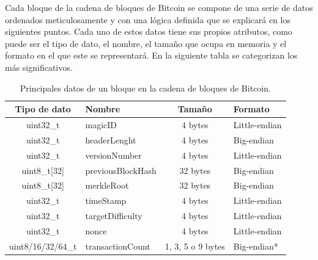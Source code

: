 \documentclass{article}
\begin{document}
    Cada bloque de la cadena de bloques de Bitcoin se compone de una serie de datos ordenados meticulosamente y con una lógica definida que se explicará en los siguientes puntos. Cada uno de estos datos tiene sus propios atributos, como puede ser el tipo de dato, el nombre, el tamaño que ocupa en memoria y el formato en el que este se representará. En la siguiente tabla se categorizan los más significativos.
    \begin{table}[H]
    \centering
    \begin{tabular}{| c | l | c | l |} 
        \hline
        Tipo de dato & Nombre & Tamaño & Formato \\
        \hline
        uint32\_t & magicID & 4 bytes & Little-endian \\
        \hline
        uint32\_t & headerLenght & 4 bytes & Big-endian \\
        \hline
        uint32\_t & versionNumber & 4 bytes & Little-endian \\
        \hline
        uint8\_t[32] & previousBlockHash & 32 bytes & Big-endian \\
        \hline
        uint8\_t[32] & merkleRoot & 32 bytes & Big-endian \\
        \hline
        uint32\_t & timeStamp & 4 bytes & Little-endian \\
        \hline
        uint32\_t & targetDifficulty & 4 bytes & Little-endian \\
        \hline
        uint32\_t & nonce & 4 bytes & Little-endian \\
        \hline
        uint8/16/32/64\_t & transactionCount & 1, 3, 5 o 9 bytes & Big-endian*  \\
        \hline
    \end{tabular}
    \caption{Principales datos de un bloque en la cadena de bloques de Bitcoin.}
    \label{table:0}
    \end{table}
    
\end{document}

